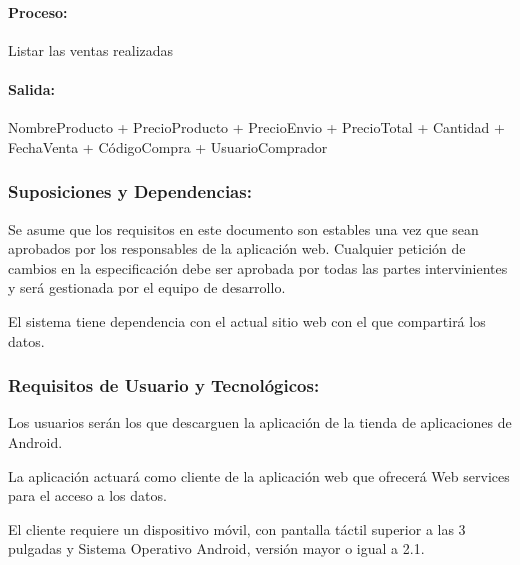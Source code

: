 \begin{enumerate}[A.]
        \paragraph{Proceso:} Listar las ventas realizadas
        
        \paragraph{Salida:} {NombreProducto + PrecioProducto + PrecioEnvio + PrecioTotal + Cantidad + FechaVenta + CódigoCompra + UsuarioComprador}
 
         \end{enumerate}
         
        \subsubsection{Suposiciones y Dependencias:}
        
            
            Se asume que los requisitos en este documento son estables una vez que sean aprobados por los responsables de la aplicación web. Cualquier petición de cambios en la especificación debe ser aprobada por todas las partes intervinientes y será gestionada por el equipo de desarrollo.
            
            
            El sistema tiene dependencia con el actual sitio web con el que compartirá los datos.
            
          \subsubsection{Requisitos de Usuario y Tecnológicos:}
        
            
            Los usuarios serán los que descarguen la aplicación de la tienda de aplicaciones de Android.
            
            
            La aplicación actuará como cliente de la aplicación web que ofrecerá Web services para el acceso a los datos.

            El cliente requiere un dispositivo móvil, con pantalla táctil superior a las 3 pulgadas y Sistema Operativo Android, versión mayor o igual a 2.1.
            
